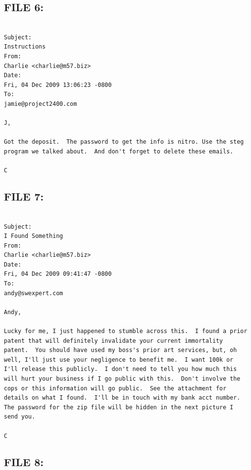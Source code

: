 \subsection{FILE 6:}
\label{sec:charlie_daten_6}

\begin{lstlisting}

Subject:
Instructions
From:
Charlie <charlie@m57.biz>
Date:
Fri, 04 Dec 2009 13:06:23 -0800
To:
jamie@project2400.com

J,

Got the deposit.  The password to get the info is nitro. Use the steg program we talked about.  And don't forget to delete these emails.

C

\end{lstlisting}

\subsection{FILE 7:}
\label{sec:charlie_daten_7}

\begin{lstlisting}

Subject:
I Found Something
From:
Charlie <charlie@m57.biz>
Date:
Fri, 04 Dec 2009 09:41:47 -0800
To:
andy@swexpert.com

Andy,

Lucky for me, I just happened to stumble across this.  I found a prior patent that will definitely invalidate your current immortality patent.  You should have used my boss's prior art services, but, oh well, I'll just use your negligence to benefit me.  I want 100k or I'll release this publicly.  I don't need to tell you how much this will hurt your business if I go public with this.  Don't involve the cops or this information will go public.  See the attachment for details on what I found.  I'll be in touch with my bank acct number.  The password for the zip file will be hidden in the next picture I send you.

C

\end{lstlisting}

\subsection{FILE 8:}
\label{sec:charlie_daten_8}

